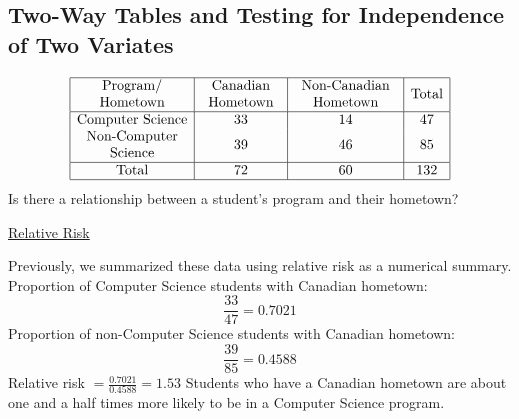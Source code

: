 \documentclass[oneside]{book}
\begin{document}
\subsection{Two-Way Tables and Testing for Independence of Two Variates}

\[ \begin{array}{|c|c|c|c|}
        \hline \begin{array}{c}
                   \text{Program/} \\
                   \text{Hometown}
               \end{array}        & \begin{array}{c}
                                        \text{Canadian} \\
                                        \text{Hometown}
                                    \end{array} & \begin{array}{c}
                                                      \text{Non-Canadian} \\
                                                      \text{Hometown}
                                                  \end{array} & \text{Total}               \\
        \hline \text{Computer Science} & 33                 & 14                     & 47  \\
        \begin{array}{c}
            \text{Non-Computer} \\
            \text{Science}
        \end{array}         & 39                 & 46                     & 85             \\
        \hline \text{Total}            & 72                 & 60                     & 132 \\
        \hline
    \end{array} \]
Is there a relationship between a student's program and their hometown?

\underline{Relative Risk}

Previously, we summarized these data using relative risk as a numerical summary.
Proportion of Computer Science students with Canadian hometown:
\[
    \frac{33}{47}=0.7021
\]
Proportion of non-Computer Science students with Canadian hometown:
\[
    \frac{39}{85}=0.4588
\]
Relative risk $=\frac{0.7021}{0.4588}=1.53$
Students who have a Canadian hometown are about one and a half times more likely to be in a Computer Science program.
\end{document}
